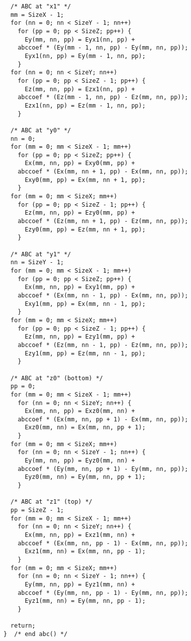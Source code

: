 \begin{program}
\begin{lstlisting}
  /* ABC at "x1" */
  mm = SizeX - 1;
  for (nn = 0; nn < SizeY - 1; nn++)
    for (pp = 0; pp < SizeZ; pp++) {
      Ey(mm, nn, pp) = Eyx1(nn, pp) +
	abccoef * (Ey(mm - 1, nn, pp) - Ey(mm, nn, pp));
      Eyx1(nn, pp) = Ey(mm - 1, nn, pp);
    }
  for (nn = 0; nn < SizeY; nn++)
    for (pp = 0; pp < SizeZ - 1; pp++) {
      Ez(mm, nn, pp) = Ezx1(nn, pp) +
	abccoef * (Ez(mm - 1, nn, pp) - Ez(mm, nn, pp));
      Ezx1(nn, pp) = Ez(mm - 1, nn, pp);
    }
  
  /* ABC at "y0" */
  nn = 0;
  for (mm = 0; mm < SizeX - 1; mm++)
    for (pp = 0; pp < SizeZ; pp++) {
      Ex(mm, nn, pp) = Exy0(mm, pp) +
	abccoef * (Ex(mm, nn + 1, pp) - Ex(mm, nn, pp));
      Exy0(mm, pp) = Ex(mm, nn + 1, pp);
    }
  for (mm = 0; mm < SizeX; mm++)
    for (pp = 0; pp < SizeZ - 1; pp++) {
      Ez(mm, nn, pp) = Ezy0(mm, pp) +
	abccoef * (Ez(mm, nn + 1, pp) - Ez(mm, nn, pp));
      Ezy0(mm, pp) = Ez(mm, nn + 1, pp);
    }
  
  /* ABC at "y1" */
  nn = SizeY - 1;
  for (mm = 0; mm < SizeX - 1; mm++)
    for (pp = 0; pp < SizeZ; pp++) {
      Ex(mm, nn, pp) = Exy1(mm, pp) +
	abccoef * (Ex(mm, nn - 1, pp) - Ex(mm, nn, pp));
      Exy1(mm, pp) = Ex(mm, nn - 1, pp);
    }
  for (mm = 0; mm < SizeX; mm++)
    for (pp = 0; pp < SizeZ - 1; pp++) {
      Ez(mm, nn, pp) = Ezy1(mm, pp) +
	abccoef * (Ez(mm, nn - 1, pp) - Ez(mm, nn, pp));
      Ezy1(mm, pp) = Ez(mm, nn - 1, pp);
    }
  
  /* ABC at "z0" (bottom) */
  pp = 0;
  for (mm = 0; mm < SizeX - 1; mm++)
    for (nn = 0; nn < SizeY; nn++) {
      Ex(mm, nn, pp) = Exz0(mm, nn) +
	abccoef * (Ex(mm, nn, pp + 1) - Ex(mm, nn, pp));
      Exz0(mm, nn) = Ex(mm, nn, pp + 1);
    }
  for (mm = 0; mm < SizeX; mm++)
    for (nn = 0; nn < SizeY - 1; nn++) {
      Ey(mm, nn, pp) = Eyz0(mm, nn) +
	abccoef * (Ey(mm, nn, pp + 1) - Ey(mm, nn, pp));
      Eyz0(mm, nn) = Ey(mm, nn, pp + 1);
    }
  
  /* ABC at "z1" (top) */
  pp = SizeZ - 1;
  for (mm = 0; mm < SizeX - 1; mm++)
    for (nn = 0; nn < SizeY; nn++) {
      Ex(mm, nn, pp) = Exz1(mm, nn) +
	abccoef * (Ex(mm, nn, pp - 1) - Ex(mm, nn, pp));
      Exz1(mm, nn) = Ex(mm, nn, pp - 1);
    }
  for (mm = 0; mm < SizeX; mm++)
    for (nn = 0; nn < SizeY - 1; nn++) {
      Ey(mm, nn, pp) = Eyz1(mm, nn) +
	abccoef * (Ey(mm, nn, pp - 1) - Ey(mm, nn, pp));
      Eyz1(mm, nn) = Ey(mm, nn, pp - 1);
    }
  
  return;
}  /* end abc() */
\end{lstlisting}
\end{program}

